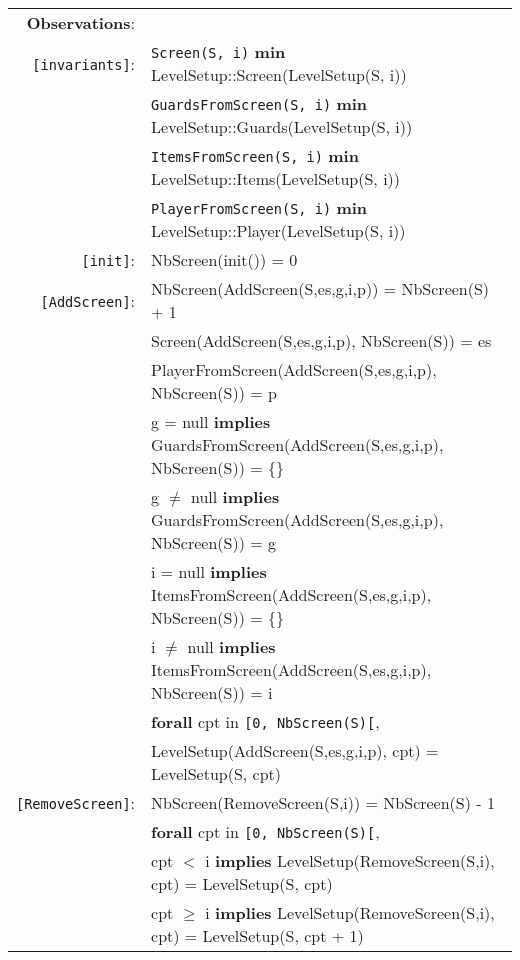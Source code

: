 \documentclass[7pt]{article}
\begin{document}
\begin{tabular}{rl}
       \textbf{Observations}: & \\
       \texttt{[invariants]}: &  \texttt{Screen(S, i)} \textbf{min} LevelSetup::Screen(LevelSetup(S, i))\\
       &  \texttt{GuardsFromScreen(S, i)} \textbf{min} LevelSetup::Guards(LevelSetup(S, i))\\
       &  \texttt{ItemsFromScreen(S, i)} \textbf{min} LevelSetup::Items(LevelSetup(S, i))\\
       &  \texttt{PlayerFromScreen(S, i)} \textbf{min} LevelSetup::Player(LevelSetup(S, i))\\
       \texttt{[init]}: & NbScreen(init()) = 0\\
       \texttt{[AddScreen]}: &  NbScreen(AddScreen(S,es,g,i,p)) = NbScreen(S) + 1 \\
       &  Screen(AddScreen(S,es,g,i,p), NbScreen(S)) = es \\
       &  PlayerFromScreen(AddScreen(S,es,g,i,p), NbScreen(S)) = p \\
       &  g = null \textbf{implies} GuardsFromScreen(AddScreen(S,es,g,i,p),  NbScreen(S)) = \{\}  \\
       &  g $\neq$ null \textbf{implies} GuardsFromScreen(AddScreen(S,es,g,i,p),  NbScreen(S)) = g  \\
       &  i = null \textbf{implies} ItemsFromScreen(AddScreen(S,es,g,i,p),  NbScreen(S)) = \{\}  \\
       &  i $\neq$ null \textbf{implies} ItemsFromScreen(AddScreen(S,es,g,i,p),  NbScreen(S)) = i  \\
       & {\textbf{forall}} cpt {in} \texttt{[0, NbScreen(S)[},~\\
       & \quad LevelSetup(AddScreen(S,es,g,i,p), cpt) = LevelSetup(S, cpt) \\
       \texttt{[RemoveScreen]}: & NbScreen(RemoveScreen(S,i)) = NbScreen(S) - 1\\
        & {\textbf{forall}} cpt {in} \texttt{[0, NbScreen(S)[},~\\
       & \quad cpt $<$ i \textbf{implies} LevelSetup(RemoveScreen(S,i), cpt) = LevelSetup(S, cpt) \\
       & \quad cpt $\geq$ i \textbf{implies} LevelSetup(RemoveScreen(S,i), cpt) = LevelSetup(S, cpt + 1) \\
\end{tabular}
\end{document}

